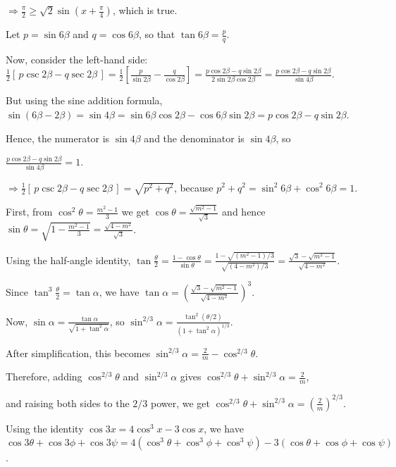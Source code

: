   $\Rightarrow \frac{\pi}{2}\geq \sqrt{2}\sin\left(x + \frac{\pi}{4}\right)$, which is true.
\item Let $p = \sin6\beta$ and $q = \cos6\beta$, so that $\tan6\beta = \frac{p}{q}$.

  Now, consider the left-hand side:
  $\frac{1}{2}[\,p\csc2\beta - q\sec2\beta\,] = \frac{1}{2}\left[\frac{p}{\sin2\beta} - \frac{q}{\cos2\beta}\right]
  = \frac{p\cos2\beta - q\sin2\beta}{2\sin2\beta\cos2\beta} = \frac{p\cos2\beta - q\sin2\beta}{\sin4\beta}$.

  But using the sine addition formula, $\sin(6\beta - 2\beta) = \sin4\beta = \sin6\beta \cos2\beta
  - \cos6\beta \sin2\beta = p\cos2\beta - q\sin2\beta$.

  Hence, the numerator is $\sin4\beta$ and the denominator is $\sin4\beta$, so

  $\frac{p\cos2\beta - q\sin2\beta}{\sin4\beta} = 1$.

  $\Rightarrow \frac{1}{2}[\,p\csc2\beta - q\sec2\beta\,] = \sqrt{p^2 + q^2}$,
  because $p^2 + q^2 = \sin^2 6\beta + \cos^2 6\beta = 1$.
\item First, from $\cos^2\theta = \frac{m^2-1}{3}$ we get $\cos\theta = \frac{\sqrt{m^2-1}}{\sqrt{3}}$ and
  hence $\sin\theta = \sqrt{1-\frac{m^2-1}{3}} = \frac{\sqrt{4-m^2}}{\sqrt{3}}$.

  Using the half-angle identity, $\tan\frac{\theta}{2} = \frac{1-\cos\theta}{\sin\theta}
  = \frac{1-\sqrt{(m^2-1)/3}}{\sqrt{(4-m^2)/3}} = \frac{\sqrt{3}-\sqrt{m^2-1}}{\sqrt{4-m^2}}$.

  Since $\tan^3\frac{\theta}{2} = \tan\alpha$, we have $\tan\alpha
  = \left(\frac{\sqrt{3}-\sqrt{m^2-1}}{\sqrt{4-m^2}}\right)^3$.

  Now, $\sin\alpha = \frac{\tan\alpha}{\sqrt{1+\tan^2\alpha}}$, so $\sin^{2/3}\alpha
  = \frac{\tan^2(\theta/2)}{(1+\tan^2\alpha)^{1/3}}$.

  After simplification, this becomes $\sin^{2/3}\alpha
  = \frac{2}{m} - \cos^{2/3}\theta$.

  Therefore, adding $\cos^{2/3}\theta$ and $\sin^{2/3}\alpha$ gives
  $\cos^{2/3}\theta + \sin^{2/3}\alpha = \frac{2}{m}$,

  and raising both sides to the $2/3$ power, we get
  $\cos^{2/3}\theta + \sin^{2/3}\alpha = \left(\frac{2}{m}\right)^{2/3}$.
\item Using the identity $\cos3x = 4\cos^3x - 3\cos x$, we have $\cos3\theta + \cos3\phi + \cos3\psi =
  4(\cos^3\theta + \cos^3\phi + \cos^3\psi) - 3(\cos\theta + \cos\phi + \cos\psi)$.

